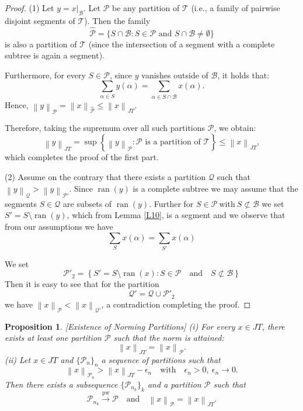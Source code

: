 \documentclass[11pt,a4paper]{amsart}
\newtheorem{proposition}[theorem]{Proposition}
\newcommand{\JT}{JT}
\newcommand{\Tree}{\mathcal{T}}
\newcommand{\norm}[1]{\left\lVert#1\right\rVert}
\newcommand{\ran}{\operatorname{ran}}
\begin{document}
\begin{proof}
    (1) Let $y = x|_{\mathcal{B}}$. Let $\mathcal{P}$ be any partition of $\Tree$ (i.e., a family of pairwise disjoint segments of $\Tree$). Then the family 
    \[ \hat{\mathcal{P}} = \{S \cap \mathcal{B} : S \in \mathcal{P} \text{ and } S \cap \mathcal{B} \neq \emptyset\} \]
    is also a partition of $\Tree$ (since the intersection of a segment with a complete subtree is again a segment). 
    
    Furthermore, for every $S \in \mathcal{P}$, since $y$ vanishes outside of $\mathcal{B}$, it holds that:
    \[ \sum_{\alpha \in S} y(\alpha) = \sum_{\alpha \in S \cap \mathcal{B}} x(\alpha). \]
    Hence, $\norm{y}_{\mathcal{P}} = \norm{x}_{\hat{\mathcal{P}}} \le \norm{x}_{\JT}$. 
    
    Therefore, taking the supremum over all such partitions $\mathcal{P}$, we obtain:
    \[ \norm{y}_{\JT} = \sup \left\{ \norm{y}_{\mathcal{P}} : \mathcal{P} \text{ is a partition of } \Tree \right\} \le \norm{x}_{\JT}, \]
    which completes the proof of the first part.
    
    (2) Assume on the contrary that there exists a partition $\mathcal{Q}$ such that $\norm{y}_\mathcal{Q} > \norm{y}_{\mathcal{P}'}$. Since $\ran(y)$ is a complete subtree we may assume that the segments $S \in \mathcal{Q}$ are subsets of $\ran(y)$. Further for $S  \in \mathcal{P} \: \text{with} \: S\not\subset \mathcal{B} $ we set $ S' = S\setminus \ran(y) $, which from Lemma \ref{L10}, is a segment and we observe that from our assumptions we have 
    \[ \sum_S x(\alpha) = \sum_{S'} x(\alpha) \]
    
   We set \[\mathcal{P}'_2 = \left\{ S' = S\setminus \ran(x) : S \in \mathcal{P} \quad \text{and} \quad S \not\subset \mathcal{B}\right\}\]
    Then it is easy to see that for the partition  
     \[ \mathcal{Q}' = \mathcal{Q} \cup  \mathcal{P}'_2 \]
     we have $\norm{x}_\mathcal{P} < \norm{x}_{\mathcal{Q}'}$, a contradiction completing the proof.
\end{proof}


\begin{proposition}\label{P1}[Existence of Norming Partitions]
  (i)   For every $x \in \JT$, there exists at least one partition $\mathcal{P}$ such that the norm is attained:
    \[ \norm{x}_{\JT} = \norm{x}_{\mathcal{P}}. \]
    (ii) Let $x\in\JT$ and $\{\mathcal{P}_n\}_n$ a sequence of partitions such that 
    \[ \norm{x}_{\mathcal{P}_n}> \norm{x}_{\JT} -\epsilon_n \quad \text{with} \quad  \epsilon_n > 0, \: \epsilon_n \to 0. \]
    Then there exists a subsequence $\{\mathcal{P}_{n_k} \}_k$ and a partition $\mathcal{P}$ such that 
    \[ \mathcal{P}_{n_k} \xrightarrow{\text{pw}} \mathcal{P} \quad \text{and} \quad \norm{x}_\mathcal{P} = \norm{x}_{\JT}. \]
        
    
\end{proposition}
\end{document}
